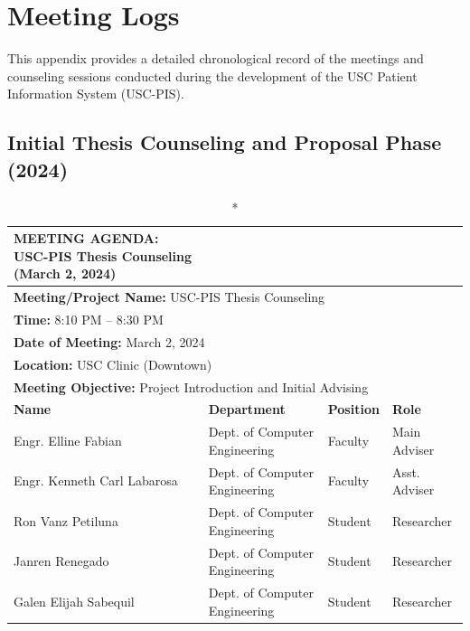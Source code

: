 
\chapter{Meeting Logs}
\label{appendix:meeting_logs}

This appendix provides a detailed chronological record of the meetings and counseling sessions conducted during the development of the USC Patient Information System (USC-PIS).

\section{Initial Thesis Counseling and Proposal Phase (2024)}

\begin{longtable}{|p{4cm}|p{4cm}|p{3cm}|p{3cm}|}
\caption*{MEETING AGENDA: USC-PIS Thesis Counseling (March 2, 2024)} \\
\hline
\multicolumn{4}{|l|}{\textbf{Meeting/Project Name:} USC-PIS Thesis Counseling} \\
\multicolumn{4}{|l|}{\textbf{Time:} 8:10 PM – 8:30 PM} \\
\multicolumn{4}{|l|}{\textbf{Date of Meeting:} March 2, 2024} \\
\multicolumn{4}{|l|}{\textbf{Location:} USC Clinic (Downtown)} \\
\multicolumn{4}{|l|}{\textbf{Meeting Objective:} Project Introduction and Initial Advising} \\
\hline
\textbf{Name} & \textbf{Department} & \textbf{Position} & \textbf{Role} \\
\hline
Engr. Elline Fabian & Dept. of Computer Engineering & Faculty & Main Adviser \\
\hline
Engr. Kenneth Carl Labarosa & Dept. of Computer Engineering & Faculty & Asst. Adviser \\
\hline
Ron Vanz Petiluna & Dept. of Computer Engineering & Student & Researcher \\
\hline
Janren Renegado & Dept. of Computer Engineering & Student & Researcher \\
\hline
Galen Elijah Sabequil & Dept. of Computer Engineering & Student & Researcher \\
\hline
\end{longtable}

